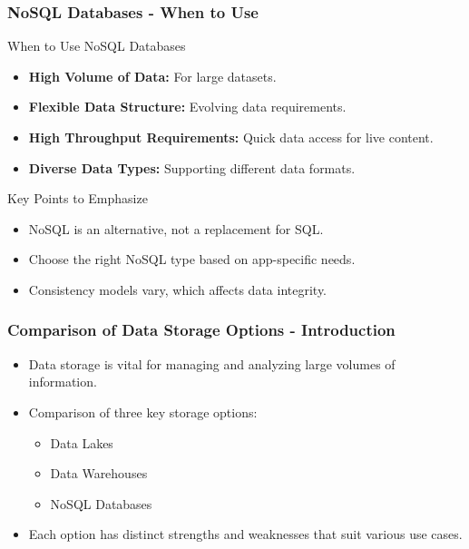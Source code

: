 \documentclass[aspectratio=169]{beamer}
\begin{document}
\begin{frame}[fragile]
    \frametitle{NoSQL Databases - When to Use}
    \begin{block}{When to Use NoSQL Databases}
        \begin{itemize}
            \item \textbf{High Volume of Data:} For large datasets.
            \item \textbf{Flexible Data Structure:} Evolving data requirements.
            \item \textbf{High Throughput Requirements:} Quick data access for live content.
            \item \textbf{Diverse Data Types:} Supporting different data formats.
        \end{itemize}
    \end{block}
    \begin{block}{Key Points to Emphasize}
        \begin{itemize}
            \item NoSQL is an alternative, not a replacement for SQL.
            \item Choose the right NoSQL type based on app-specific needs.
            \item Consistency models vary, which affects data integrity.
        \end{itemize}
    \end{block}
\end{frame}

\begin{frame}[fragile]
    \frametitle{Comparison of Data Storage Options - Introduction}
    \begin{itemize}
        \item Data storage is vital for managing and analyzing large volumes of information.
        \item Comparison of three key storage options:
            \begin{itemize}
                \item Data Lakes
                \item Data Warehouses
                \item NoSQL Databases
            \end{itemize}
        \item Each option has distinct strengths and weaknesses that suit various use cases.
    \end{itemize}
\end{frame}
\end{document}
